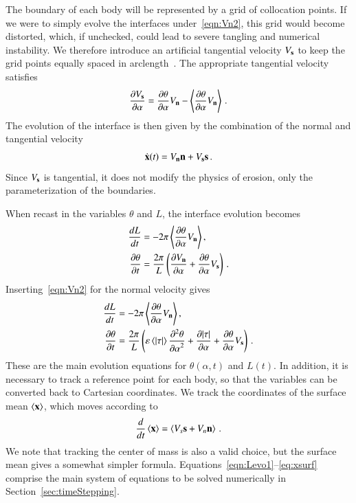 \documentclass[preprint, 10pt]{elsarticle}
\begin{document}
The boundary of each body will be represented by a grid of collocation points. If we were to simply evolve the interfaces under~\eqref{eqn:Vn2}, this grid would become distorted, which, if unchecked, could lead to severe tangling and numerical instability. We therefore introduce an artificial tangential velocity $V_{\mathbf{s}}$ to keep the grid points equally spaced in arclength~\cite{hou-low-she1994}. The appropriate tangential velocity satisfies 
\begin{align}
  \frac{\partial V_{\mathbf{s}}}{\partial \alpha} = \frac{\partial \theta}{\partial \alpha} V_{\mathbf{n}} - \left< \frac{\partial \theta}{\partial \alpha} V_{\mathbf{n}} \right> \, .
\end{align} 
The evolution of the interface is then given by the combination of the normal and tangential velocity
\begin{align}
  \dot{{\mathbf{x}}}(t) = V_{\mathbf{n}} {\mathbf{n}} + V_{\mathbf{s}} {\mathbf{s}} \, .
\end{align}
Since $V_{\mathbf{s}}$ is tangential, it does not modify the physics of erosion, only the parameterization of the boundaries.

When recast in the variables $\theta$ and $L$, the interface evolution becomes
\begin{align}
  \frac{d L}{d t} &= - 2 \pi \left< \frac{\partial \theta}{\partial \alpha} V_{\mathbf{n}} \right>, \\
  \frac{\partial \theta}{\partial t} &= \frac{2 \pi}{L} \left( \frac{\partial V_{\mathbf{n}}}{\partial \alpha} + \frac{\partial \theta}{\partial \alpha} V_{\mathbf{s}} \right) \, .
\end{align}
Inserting~\eqref{eqn:Vn2} for the normal velocity gives
\begin{align}
\label{eqn:Levo1}
\frac{d L}{d t} &= - 2 \pi \left< \frac{\partial \theta}{\partial \alpha} V_{\mathbf{n}} \right>, \\
\label{eqn:thetaevo1}
  \frac{\partial \theta}{\partial t} &= \frac{2\pi}{L} \left(
  \varepsilon \left< \lvert \tau \rvert \right> \frac{\partial^2 \theta}{{\partial \alpha}^2} + \frac{\partial \lvert \tau \rvert}{\partial \alpha} +
  \frac{\partial \theta}{\partial \alpha} V_{\mathbf{s}} \right)\,.
\end{align}
These are the main evolution equations for $\theta(\alpha,t)$ and $L(t)$.  In addition, it is necessary to track a reference point for each body, so that the {\thL} variables can be converted back to Cartesian coordinates. We track the coordinates of the surface mean $\left< {\mathbf{x}} \right>$, which moves according to
\begin{align}
\label{eq:xsurf}
\frac{d}{dt} \left< {\mathbf{x}} \right> = \left<  V_s {\mathbf{s}} + V_n {\mathbf{n}}  \right> \, .
\end{align}
We note that tracking the center of mass is also a valid choice, but the surface mean gives a somewhat simpler formula. Equations~\eqref{eqn:Levo1}--\eqref{eq:xsurf} comprise the main system of equations to be solved numerically in Section~\ref{sec:timeStepping}. 
\end{document}
